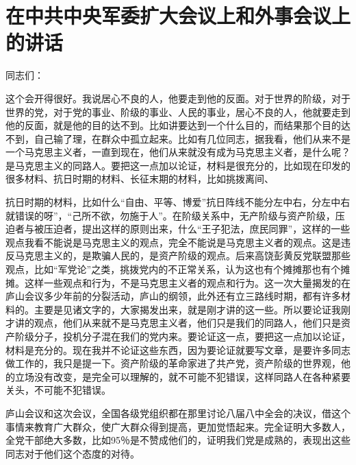 \section[在中共中央军委扩大会议上和外事会议上的讲话（一九五九年九月十一日）]{在中共中央军委扩大会议上和外事会议上的讲话}


同志们：

这个会开得很好。我说居心不良的人，他要走到他的反面。对于世界的阶级，对于世界的党，对于党的事业、阶级的事业、人民的事业，居心不良的人，他就要走到他的反面，就是他的目的达不到。比如讲要达到一个什么目的，而结果那个目的达不到，自己输了理，在群众中孤立起来。比如有几位同志，据我看，他们从来不是一个马克思主义者，一直到现在，他们从来就没有成为马克思主义者，是什么呢？是马克思主义的同路人。要把这一点加以论证，材料是很充分的，比如现在印发的很多材料、抗日时期的材料、长征末期的材料，比如挑拨离间、

抗日时期的材料，比如什么“自由、平等、博爱”抗日阵线不能分左中右，分左中右就错误的呀”，“己所不欲，勿施于人”。在阶级关系中，无产阶级与资产阶级，压迫者与被压迫者，提出这样的原则出来，什么“王子犯法，庶民同罪”，这样的一些观点我看不能说是马克思主义的观点，完全不能说是马克思主义者的观点。这是违反马克思主义的，是欺骗人民的，是资产阶级的观点。后来高饶彭黄反党联盟那些观点，比如“军党论”之类，挑拨党内的不正常关系，认为这也有个摊摊那也有个摊摊。这样一些观点和行为，不是马克思主义者的观点和行为。这一次大量揭发的在庐山会议多少年前的分裂活动，庐山的纲领，此外还有立三路线时期，都有许多材料的。主要是见诸文字的，大家揭发出来，就是刚才讲的这一些。所以要论证我刚才讲的观点，他们从来就不是马克思主义者，他们只是我们的同路人，他们只是资产阶级分子，投机分子混在我们的党内来。要论证这一点，要把这一点加以论证，材料是充分的。现在我并不论证这些东西，因为要论证就要写文章，是要许多同志做工作的，我只是提一下。资产阶级的革命家进了共产党，资产阶级的世界观，他的立场没有改变，是完全可以理解的，就不可能不犯错误，这样同路人在各种紧要关头，不可能不犯错误。

庐山会议和这次会议，全国各级党组织都在那里讨论八届八中全会的决议，借这个事情来教育广大群众，使广大群众得到提高，更加觉悟起来。完全证明大多数人，全党干部绝大多数，比如95％是不赞成他们的，证明我们党是成熟的，表现出这些同志对于他们这个态度的对待。

